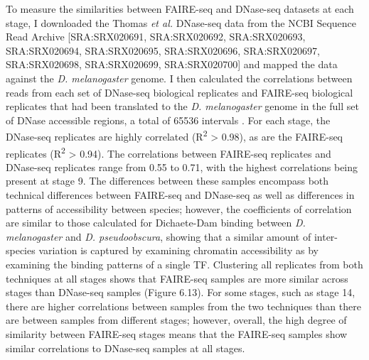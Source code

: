 To measure the similarities between FAIRE-seq and DNase-seq datasets at each stage, I downloaded the Thomas \emph{et al.} DNase-seq data from the NCBI Sequence Read Archive [SRA:SRX020691, SRA:SRX020692, SRA:SRX020693, SRA:SRX020694, SRA:SRX020695, SRA:SRX020696, SRA:SRX020697, SRA:SRX020698, SRA:SRX020699, SRA:SRX020700] and mapped the data against the \emph{D. melanogaster} genome. I then calculated the correlations between reads from each set of DNase-seq biological replicates and FAIRE-seq biological replicates that had been translated to the \emph{D. melanogaster} genome in the full set of DNase accessible regions, a total of 65536 intervals \citep{thomas_dynamic_2011}. For each stage, the DNase-seq replicates are highly correlated (R\textsuperscript{2} > 0.98), as are the FAIRE-seq replicates (R\textsuperscript{2} > 0.94). The correlations between FAIRE-seq replicates and DNase-seq replicates range from 0.55 to 0.71, with the highest correlations being present at stage 9. The differences between these samples encompass both technical differences between FAIRE-seq and DNase-seq as well as differences in patterns of accessibility between species; however, the coefficients of correlation are similar to those calculated for Dichaete-Dam binding between \emph{D. melanogaster} and \emph{D. pseudoobscura}, showing that a similar amount of inter-species variation is captured by examining chromatin accessibility as by examining the binding patterns of a single TF. Clustering all replicates from both techniques at all stages shows that FAIRE-seq samples are more similar across stages than DNase-seq samples (Figure 6.13). For some stages, such as stage 14, there are higher correlations between samples from the two techniques than there are between samples from different stages; however, overall, the high degree of similarity between FAIRE-seq stages means that the FAIRE-seq samples show similar correlations to DNase-seq samples at all stages.\\

